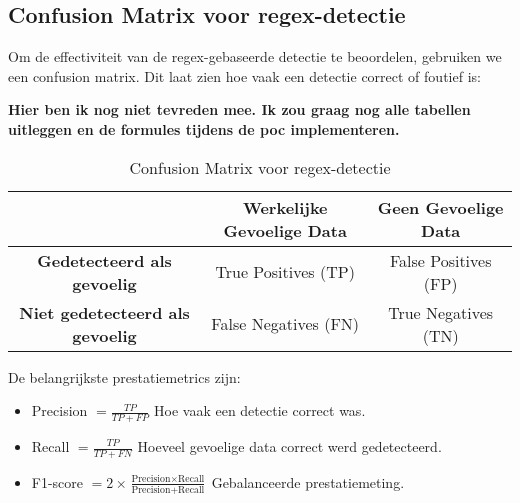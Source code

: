 \subsection{Confusion Matrix voor regex-detectie}
Om de effectiviteit van de regex-gebaseerde detectie te beoordelen, gebruiken we een confusion matrix. Dit laat zien hoe vaak een detectie correct of foutief is:

\textbf{Hier ben ik nog niet tevreden mee. Ik zou graag nog alle tabellen uitleggen en de formules tijdens de poc implementeren.}

\begin{table}[h]
    \centering
    \begin{tabular}{|c|c|c|}
        \hline
        \textbf{} & \textbf{Werkelijke Gevoelige Data} & \textbf{Geen Gevoelige Data} \\ \hline
        \textbf{Gedetecteerd als gevoelig} & True Positives (TP) & False Positives (FP) \\ \hline
        \textbf{Niet gedetecteerd als gevoelig} & False Negatives (FN) & True Negatives (TN) \\ \hline
    \end{tabular}
    \caption{Confusion Matrix voor regex-detectie}
    \label{tab:confusion_matrix}
\end{table}

De belangrijkste prestatiemetrics zijn:
\begin{itemize}
    \item Precision \( = \frac{TP}{TP + FP} \) Hoe vaak een detectie correct was.
    \item Recall \( = \frac{TP}{TP + FN} \) Hoeveel gevoelige data correct werd gedetecteerd.
    \item F1-score \( = 2 \times \frac{\text{Precision} \times \text{Recall}}{\text{Precision} + \text{Recall}} \) Gebalanceerde prestatiemeting.
\end{itemize}




